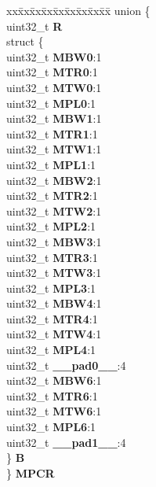 \begin{DoxyCompactItemize}
\begin{tabbing}
\end{tabbing}\item 
\mbox{\label{structPBRIDGE__B__tag_a5671531fab961a3ebd8372c2ac9e3cdf}} 
\begin{tabbing}
xx\=xx\=xx\=xx\=xx\=xx\=xx\=xx\=xx\=\kill
union \{\\
\>uint32\_t {\bfseries R}\\
\>struct \{\\
\>\>uint32\_t {\bfseries MBW0}:1\\
\>\>uint32\_t {\bfseries MTR0}:1\\
\>\>uint32\_t {\bfseries MTW0}:1\\
\>\>uint32\_t {\bfseries MPL0}:1\\
\>\>uint32\_t {\bfseries MBW1}:1\\
\>\>uint32\_t {\bfseries MTR1}:1\\
\>\>uint32\_t {\bfseries MTW1}:1\\
\>\>uint32\_t {\bfseries MPL1}:1\\
\>\>uint32\_t {\bfseries MBW2}:1\\
\>\>uint32\_t {\bfseries MTR2}:1\\
\>\>uint32\_t {\bfseries MTW2}:1\\
\>\>uint32\_t {\bfseries MPL2}:1\\
\>\>uint32\_t {\bfseries MBW3}:1\\
\>\>uint32\_t {\bfseries MTR3}:1\\
\>\>uint32\_t {\bfseries MTW3}:1\\
\>\>uint32\_t {\bfseries MPL3}:1\\
\>\>uint32\_t {\bfseries MBW4}:1\\
\>\>uint32\_t {\bfseries MTR4}:1\\
\>\>uint32\_t {\bfseries MTW4}:1\\
\>\>uint32\_t {\bfseries MPL4}:1\\
\>\>uint32\_t {\bfseries \_\_pad0\_\_}:4\\
\>\>uint32\_t {\bfseries MBW6}:1\\
\>\>uint32\_t {\bfseries MTR6}:1\\
\>\>uint32\_t {\bfseries MTW6}:1\\
\>\>uint32\_t {\bfseries MPL6}:1\\
\>\>uint32\_t {\bfseries \_\_pad1\_\_}:4\\
\>\} {\bfseries B}\\
\} {\bfseries MPCR}\\


\end{tabbing}
\end{DoxyCompactItemize}
